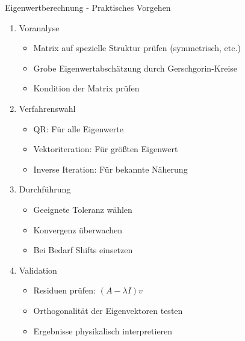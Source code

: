 \begin{KR}{Eigenwertberechnung - Praktisches Vorgehen}
\begin{enumerate}
    \item Voranalyse
    \begin{itemize}
        \item Matrix auf spezielle Struktur prüfen (symmetrisch, etc.)
        \item Grobe Eigenwertabschätzung durch Gerschgorin-Kreise
        \item Kondition der Matrix prüfen
    \end{itemize}
    
    \item Verfahrenswahl
    \begin{itemize}
        \item QR: Für alle Eigenwerte
        \item Vektoriteration: Für größten Eigenwert
        \item Inverse Iteration: Für bekannte Näherung
    \end{itemize}
    
    \item Durchführung
    \begin{itemize}
        \item Geeignete Toleranz wählen
        \item Konvergenz überwachen
        \item Bei Bedarf Shifts einsetzen
    \end{itemize}
    
    \item Validation
    \begin{itemize}
        \item Residuen prüfen: $(A-\lambda I)v$
        \item Orthogonalität der Eigenvektoren testen
        \item Ergebnisse physikalisch interpretieren
    \end{itemize}
\end{enumerate}
\end{KR}